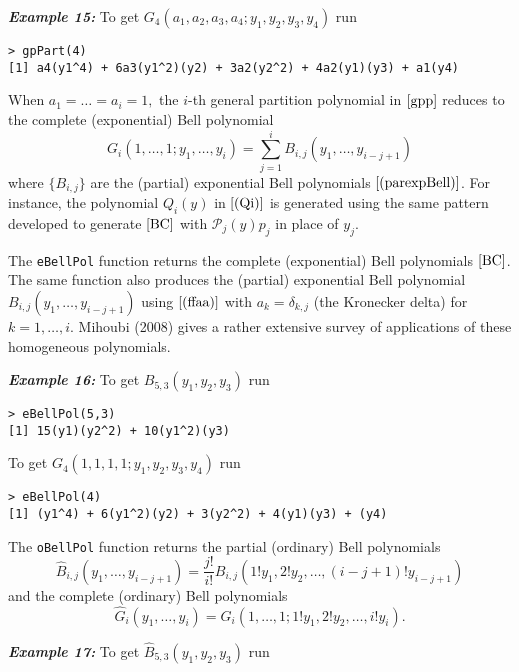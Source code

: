 \hskip-0.5cm\textbf{\emph{Example 15:}} To get \(G_4( a_1, a_2, a_3, a_4; y_1, y_2, y_3, y_4)\) run

\begin{verbatim}
> gpPart(4)
[1] a4(y1^4) + 6a3(y1^2)(y2) + 3a2(y2^2) + 4a2(y1)(y3) + a1(y4)
\end{verbatim}

When \(a_1 = \ldots = a_i =1,\) the \(i\)-th general partition polynomial in \(\eqref{gpp}\) reduces to
the complete (exponential) Bell polynomial
\begin{equation}
G_i( 1, \ldots, 1; y_1, \ldots, y_i) =  \sum_{j=1}^i B_{i,j}(y_1, \ldots, y_{i-j+1})
\label{BC}
\end{equation}
where \(\{B_{i,j}\}\) are the (partial) exponential Bell polynomials \(\eqref{(parexpBell)}\).
For instance, the polynomial \(Q_i(y)\) in \(\eqref{(Qi)}\) is generated using the same pattern developed to generate \(\eqref{BC}\) with \({\mathcal P}_{j}(y) p_{j}\) in place of \(y_j.\)

The \texttt{eBellPol} function returns the complete (exponential) Bell polynomials \(\eqref{BC}\). The same function also produces the (partial) exponential Bell polynomial \(B_{i,j}(y_1, \ldots, y_{i-j+1})\) using \(\eqref{(ffaa)}\) with \(a_k=\delta_{k,j}\) (the Kronecker delta) for \(k=1, \ldots,i.\) Mihoubi (2008) gives a rather extensive survey of applications of these homogeneous polynomials.

\hskip-0.5cm\textbf{\emph{Example 16:}} To get \(B_{5,3}(y_1, y_2, y_{3})\) run

\begin{verbatim}
> eBellPol(5,3)
[1] 15(y1)(y2^2) + 10(y1^2)(y3)
\end{verbatim}

\noindent To get \(G_4(1, 1, 1, 1; y_1, y_2, y_3, y_4)\) run

\begin{verbatim}
> eBellPol(4)
[1] (y1^4) + 6(y1^2)(y2) + 3(y2^2) + 4(y1)(y3) + (y4)
\end{verbatim}

The \texttt{oBellPol} function returns the partial (ordinary) Bell polynomials
\[\hat{B}_{i,j}(y_1, \ldots, y_{i-j+1}) = \frac{j!}{i!} B_{i,j}(1! y_1, 2! y_2, \ldots, (i-j+1)! y_{i-j+1})\]
and the complete (ordinary) Bell polynomials
\[\hat{G}_i(y_1, \ldots, y_i) =  G_i(1, \ldots, 1; 1! y_1, 2! y_2, \ldots, i! y_i).\]

\hskip-0.5cm\textbf{\emph{Example 17:}} To get \(\hat{B}_{5,3}(y_1, y_2,y_3)\) run

